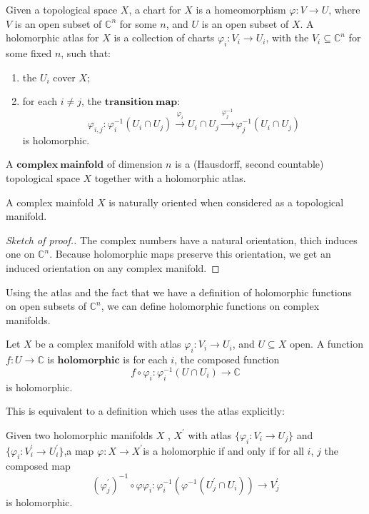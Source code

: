 \documentclass{article}
\begin{document}
\begin{definition}
	Given a topological space $X$, a chart for $X$ is a homeomorphism $\varphi :V \to U$, where $V$ is an open subset of $\mathbb{C}^{n}$ for some $n$, and $U$ is an open subset of $X$. A holomorphic atlas for $X$ is a collection of charts $\varphi_{i}: V_{i} \to U_{i}$, with the $V_{i} \subseteq \mathbb{C}^{n}$ for some fixed $n$, such that:\\
  \begin{enumerate}[(1)]
    \item{the $U_{i}$ cover $X$;}
    \item{for each $i \ne j$, the $\mathbf{transition \ map}$:
    \begin{displaymath}
      \varphi_{i,j}: \varphi^{-1}_{i}(U_{i} \cap U_{j}) \xrightarrow{\varphi_{i}} U_{i} \cap U_{j} \xrightarrow{\varphi_{j}^{-1}} \varphi_{j}^{-1}(U_i{} \cap U_{j})
    \end{displaymath}
    is holomorphic.}
  \end{enumerate}


\end{definition}
A $\mathbf{complex \ mainfold}$ of dimension $n$ is a (Hausdorff, second countable) topological space $X$ together with a holomorphic atlas.
\begin{proposition}
	A complex mainfold $X$ is naturally oriented when considered as a topological manifold.
\end{proposition}
\begin{proof}[Sketch of proof.]
  The complex numbers have a natural orientation, thich induces one on $\mathbb{C}^{n}$. Because holomorphic maps preserve this orientation, we get an induced orientation on any complex manifold.
\end{proof}
Using the atlas and the fact that we have a definition of holomorphic functions on open subsets of $\mathbb{C}^{n}$, we can define holomorphic functions on complex manifolds.
\begin{definition}
	Let $X$ be a complex manifold with atlas $\varphi_{i}:V_{i} \to U_{i}$, and $U \subseteq X$ open. A function $f:U \to \mathbb{C}$ is $\mathbf{holomorphic}$ is for each $i$, the composed function
	\begin{displaymath}
		f \circ \varphi_{i}:\varphi_{i}^{-1}(U \cap U_{i}) \to \mathbb{C}
	\end{displaymath}
	is holomorphic.
\end{definition}
This is equivalent to a definition which uses the atlas explicitly:
\begin{definition}
Given two holomorphic manifolds $X$ , $X^{'}$ with atlas $\{\varphi_{i}:V_{i}\to  U_{j}\}$ and $\{\varphi_{i}:V_{i}^{'}\to U_{i}^{'}\}$,a map $\varphi:X\to X^{'}$is a holomorphic if and only if for all $i$, $j$ the composed map
\begin{displaymath}
(\varphi^{'}_{j})^{-1} \circ \varphi\varphi_{i}:\varphi^{-1}_{i}(\varphi^{-1}(U^{'}_{j}\cap U_{i}))\to V^{'}_{j}
\end{displaymath}
is holomorphic.
\end{definition}
\end{document}
